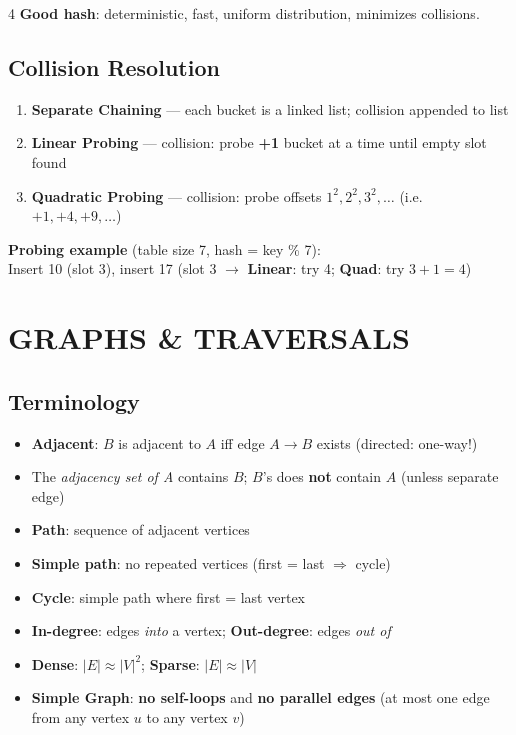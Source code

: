 \documentclass[7pt,landscape]{article}
\newcommand{\kw}[1]{\textbf{\textcolor{secblue}{#1}}}
\begin{document}
\begin{multicols}{4}
\textbf{Good hash}: deterministic, fast, uniform distribution, minimizes collisions.

\subsection{Collision Resolution}
\begin{enumerate}
  \item \kw{Separate Chaining} — each bucket is a linked list; collision appended to list
  \item \kw{Linear Probing} — collision: probe \textbf{+1} bucket at a time until empty slot found
  \item \kw{Quadratic Probing} — collision: probe offsets $1^2, 2^2, 3^2, \ldots$ (i.e.\ $+1, +4, +9, \ldots$)
\end{enumerate}

\textbf{Probing example} (table size 7, hash = key \% 7):\\
Insert 10 (slot 3), insert 17 (slot 3 $\to$ \textbf{Linear}: try 4; \textbf{Quad}: try $3{+}1{=}4$)

\section{GRAPHS \& TRAVERSALS}

\subsection{Terminology}
\begin{itemize}
  \item \kw{Adjacent}: $B$ is adjacent to $A$ iff edge $A \to B$ exists (directed: one-way!)
  \item The \textit{adjacency set of A} contains $B$; $B$'s does \textbf{not} contain $A$ (unless separate edge)
  \item \kw{Path}: sequence of adjacent vertices
  \item \kw{Simple path}: no repeated vertices (first = last $\Rightarrow$ cycle)
  \item \kw{Cycle}: simple path where first = last vertex
  \item \kw{In-degree}: edges \textit{into} a vertex; \kw{Out-degree}: edges \textit{out of}
  \item \kw{Dense}: $|E| \approx |V|^2$; \quad \kw{Sparse}: $|E| \approx |V|$
  \item \kw{Simple Graph}: \textbf{no self-loops} and \textbf{no parallel edges} (at most one edge from any vertex $u$ to any vertex $v$)
\end{itemize}


\end{multicols}
\end{document}
